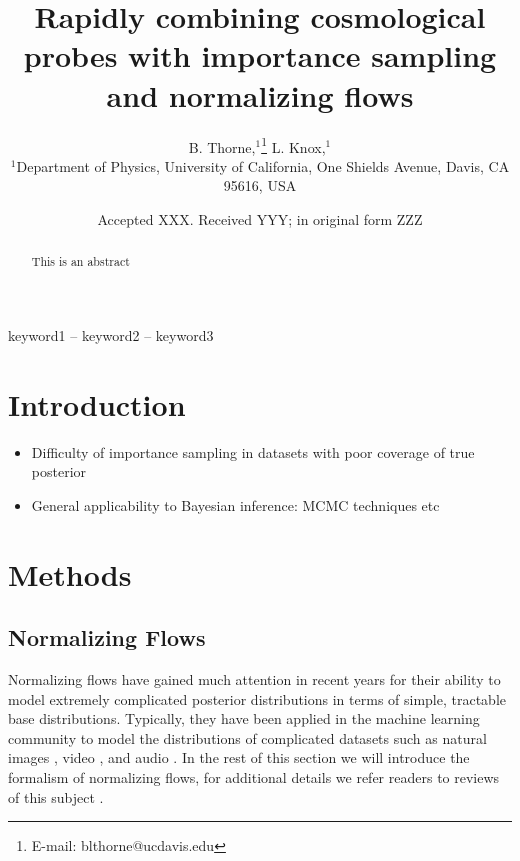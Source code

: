 \documentclass[fleqn,usenatbib]{mnras}
\title[Importance sampling with normalizing flows]{Rapidly combining cosmological probes with importance sampling and normalizing flows }
\author[B. Thorne]{
B. Thorne,$^{1}$\thanks{E-mail: blthorne@ucdavis.edu}
L. Knox,$^{1}$
\\
$^{1}$Department of Physics, University of California, One Shields Avenue, Davis, CA 95616, USA\\
}
\date{Accepted XXX. Received YYY; in original form ZZZ}
\begin{document}
\label{firstpage}
\pagerange{\pageref{firstpage}--\pageref{lastpage}}
\maketitle

\begin{abstract}
This is an abstract
\end{abstract}

\begin{keywords}
keyword1 -- keyword2 -- keyword3
\end{keywords}



\section{Introduction}

\begin{itemize}
    \item Difficulty of importance sampling in datasets with poor coverage of true posterior
    \item General applicability to Bayesian inference: MCMC techniques etc
\end{itemize}

\section{Methods}

\subsection{Normalizing Flows}
\label{sec:normalizing_flows} %

Normalizing flows have gained much attention in recent years for their ability to model extremely complicated posterior distributions in terms of simple, tractable base distributions. Typically, they have been applied in the machine learning community to model the distributions of complicated datasets such as natural images \cite{ho/etal:2019, grathwohl/etal:2018, kingma/dhariwal:2018}, video \cite{kumar/etal:2019}, and audio \cite{kim/etal:2018}. In the rest of this section we will introduce the formalism of normalizing flows, for additional details we refer readers to reviews of this subject \cite{kobyzev/etal:2019, papamakarios/etal:2019}.
\end{document}
